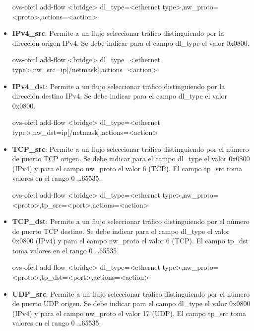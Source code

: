 \begin{itemize}
\begin{center}
ovs-ofctl add-flow <bridge> dl\_type=<ethernet type>,nw\_proto=<proto>,actions=<action>
\end{center}

\item \textbf{IPv4\_src}: Permite a un flujo seleccionar tr\'afico distinguiendo por la dirección origen IPv4. Se debe indicar para el campo dl\_type el valor 0x0800.  

\begin{center}
ovs-ofctl add-flow <bridge> dl\_type=<ethernet type>,nw\_src=ip[/netmask],actions=<action>
\end{center}

\item \textbf{IPv4\_dst}: Permite a un flujo seleccionar tr\'afico distinguiendo por la dirección destino IPv4. Se debe indicar para el campo dl\_type el valor 0x0800.  

\begin{center}
ovs-ofctl add-flow <bridge> dl\_type=<ethernet type>,nw\_dst=ip[/netmask],actions=<action>
\end{center}
 
\item \textbf{TCP\_src}: Permite a un flujo seleccionar tr\'afico distinguiendo por el n\'umero de puerto TCP origen. Se debe indicar para el campo dl\_type el valor 0x0800 (IPv4) y para el campo nw\_proto el valor 6 (TCP). El campo tp\_src toma valores en el rango 0 \dots 65535.

\begin{center}
ovs-ofctl add-flow <bridge> dl\_type=<ethernet type>,nw\_proto=<proto>,tp\_src=<port>,actions=<action>
\end{center}

\item \textbf{TCP\_dst}: Permite a un flujo seleccionar tr\'afico distinguiendo por el n\'umero de puerto TCP destino. Se debe indicar para el campo dl\_type el valor 0x0800 (IPv4) y para el campo nw\_proto el valor 6 (TCP). El campo tp\_dst toma valores en el rango 0 \dots 65535.

\begin{center}
ovs-ofctl add-flow <bridge> dl\_type=<ethernet type>,nw\_proto=<proto>,tp\_dst=<port>,actions=<action>
\end{center}

\item \textbf{UDP\_src}: Permite a un flujo seleccionar tr\'afico distinguiendo por el n\'umero de puerto UDP origen. Se debe indicar para el campo dl\_type el valor 0x0800 (IPv4) y para el campo nw\_proto el valor 17 (UDP). El campo tp\_src toma valores en el rango 0 \dots 65535.


\end{itemize}
